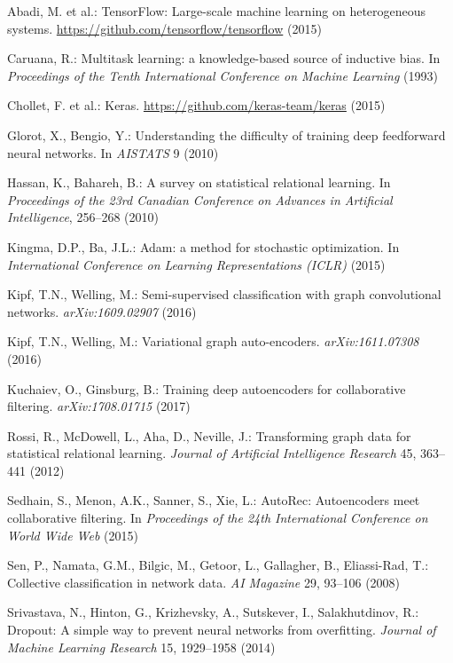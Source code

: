 \documentclass{article}
\begin{document}
%
%
\begin{thebibliography}{99}
%

Abadi, M. et al.:
TensorFlow: Large-scale machine learning on heterogeneous systems.
\url{https://github.com/tensorflow/tensorflow} (2015)

Caruana, R.:
Multitask learning: a knowledge-based source of inductive bias.
In \emph{Proceedings of the Tenth International Conference on Machine Learning} (1993)

Chollet, F. et al.:
Keras.
\url{https://github.com/keras-team/keras} (2015)

Glorot, X., Bengio, Y.:
Understanding the difficulty of training deep feedforward neural networks.
In \emph{AISTATS} 9 (2010)

Hassan, K., Bahareh, B.:
A survey on statistical relational learning.
In \emph{Proceedings of the 23rd Canadian Conference on Advances in Artificial Intelligence}, 256--268 (2010)

Kingma, D.P., Ba, J.L.:
Adam: a method for stochastic optimization.
In \emph{International Conference on Learning Representations (ICLR)} (2015)

Kipf, T.N., Welling, M.:
Semi-supervised classification with graph convolutional networks.
\emph{arXiv:1609.02907} (2016)

Kipf, T.N., Welling, M.:
Variational graph auto-encoders.
\emph{arXiv:1611.07308} (2016)

Kuchaiev, O., Ginsburg, B.:
Training deep autoencoders for collaborative filtering.
\emph{arXiv:1708.01715} (2017)

Rossi, R., McDowell, L., Aha, D., Neville, J.:
Transforming graph data for statistical relational learning.
\emph{Journal of Artificial Intelligence Research} 45, 363--441 (2012)

Sedhain, S., Menon, A.K., Sanner, S., Xie, L.:
AutoRec: Autoencoders meet collaborative filtering.
In \emph{Proceedings of the 24th International Conference on World Wide Web} (2015)

Sen, P., Namata, G.M., Bilgic, M., Getoor, L., Gallagher, B., Eliassi-Rad, T.:
Collective classification in network data.
\emph{AI Magazine} 29, 93--106 (2008)

Srivastava, N., Hinton, G., Krizhevsky, A., Sutskever, I., Salakhutdinov, R.:
Dropout: A simple way to prevent neural networks from overfitting.
\emph{Journal of Machine Learning Research} 15, 1929--1958 (2014)


\end{thebibliography}
\end{document}
